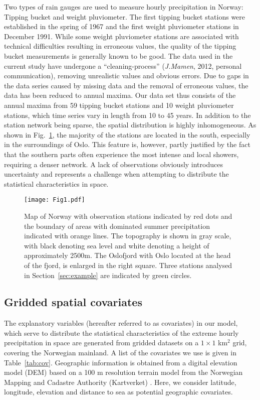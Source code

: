 \documentclass[11pt,english]{article}
\begin{document}
Two types of rain gauges are used to measure hourly precipitation in Norway: Tipping bucket and weight pluviometer. The first tipping bucket stations were established in the spring of 1967 and the first weight pluviometer stations in December 1991. While some weight pluviometer stations are associated with technical difficulties resulting in erroneous values, the quality of the tipping bucket measurements is generally known to be good.  The data used in the current study have undergone a ``cleaning-process'' ({\em J.Mamen}, 2012, personal communication), removing unrealistic values and obvious errors.  Due to gaps in the data series caused by missing data and the removal of erroneous values, the data has been reduced to annual maxima. Our data set thus consists of the annual maxima from 59 tipping bucket stations and 10 weight pluviometer stations, which time series vary in length from 10 to 45 years.  In addition to the station network being sparse, the spatial distribution is highly inhomogeneous. As shown in Fig.~\ref{fig:fig1}, the majority of the stations are located in the south, especially in the surroundings of Oslo. This feature is, however, partly justified by the fact that the southern parts often experience the most intense and local showers, requiring a denser network. A lack of observations obviously introduces uncertainty and represents a challenge when attempting to distribute the statistical characteristics in space. 

\begin{figure}[!htbp]
\begin{center}
\texttt{[image: Fig1.pdf]} 
\end{center}
\caption[stations]{\label{fig:fig1}Map of Norway with observation stations indicated by red dots and the boundary of areas with dominated summer precipitation indicated with orange lines. The topography is shown in gray scale, with black denoting sea level and white denoting a height of approximately 2500m. The Oslofjord with Oslo located at the head of the fjord, is enlarged in the right square. Three stations analysed in Section~\ref{sec:example} are indicated by green circles.}
\end{figure}

\subsection{Gridded spatial covariates}\label{sec:datasets}

The explanatory variables (hereafter referred to as covariates) in our model, which serve to distribute the statistical characteristics of the extreme hourly precipitation in space are generated from gridded datasets on a $1 \times 1$ km$^2$ grid, covering the Norwegian mainland.  A list of the covariates we use is given in Table~\ref{tab:cov}.  Geographic information is obtained from a digital elevation model (DEM) based on a 100 m resolution terrain model from the Norwegian Mapping and Cadastre Authority (Kartverket) \citep{Mohr2009}.  Here, we consider latitude, longitude, elevation and distance to sea as potential geographic covariates.  
\end{document}
